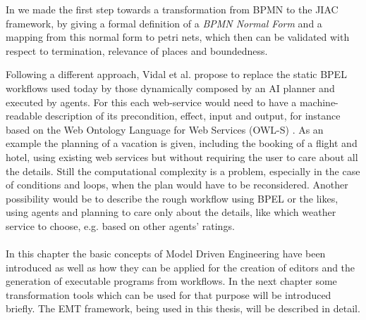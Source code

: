 In \cite{bpmn2agents} we made the first step towards a transformation from BPMN to the JIAC framework, by giving a formal definition of a \emph{BPMN Normal Form} and a mapping from this normal form to petri nets, which then can be validated with respect to termination, relevance of places and boundedness.

Following a different approach, Vidal et al. \cite{vidal04a} propose to replace the static BPEL workflows used today by those dynamically composed by an AI planner and executed by agents. For this each web-service would need to have a machine-readable description of its precondition, effect, input and output, for instance based on the Web Ontology Language for Web Services (OWL-S) \cite{spec_owls}. As an example the planning of a vacation is given, including the booking of a flight and hotel, using existing web services but without requiring the user to care about all the details. Still the computational complexity is a problem, especially in the case of conditions and loops, when the plan would have to be reconsidered. Another possibility would be to describe the rough workflow using BPEL or the likes, using agents and planning to care only about the details, like which weather service to choose, e.g. based on other agents' ratings.
\\
\\

In this chapter the basic concepts of Model Driven Engineering have been introduced as well as how they can be applied for the creation of editors and the generation of executable programs from workflows. In the next chapter some transformation tools which can be used for that purpose will be introduced briefly. The EMT framework, being used in this thesis, will be described in detail.
